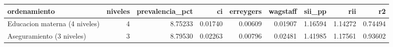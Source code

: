 \begin{tabular}{lrrrrrrrr}
\toprule
ordenamiento & niveles & prevalencia\_pct & ci & erreygers & wagstaff & sii\_pp & rii & r2 \\
\midrule
Educacion materna (4 niveles) & 4 & 8.75233 & 0.01740 & 0.00609 & 0.01907 & 1.16594 & 1.14272 & 0.74494 \\
Aseguramiento (3 niveles) & 3 & 8.79530 & 0.02263 & 0.00796 & 0.02481 & 1.41985 & 1.17561 & 0.93602 \\
\bottomrule
\end{tabular}
